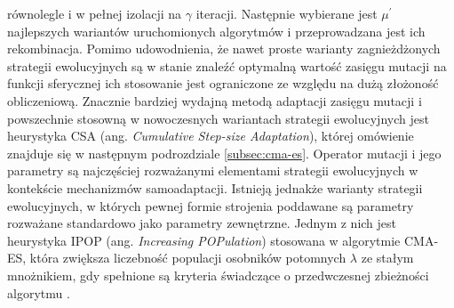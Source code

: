    równolegle i w pełnej izolacji na $\gamma$ iteracji. Następnie wybierane jest $\mu^{'}$ najlepszych wariantów uruchomionych algorytmów i przeprowadzana jest ich rekombinacja. Pomimo udowodnienia, że nawet proste warianty zagnieżdżonych strategii ewolucyjnych są w stanie znaleźć optymalną wartość zasięgu mutacji na funkcji sferycznej \cite{Grunz:1994} ich stosowanie jest ograniczone ze względu na dużą złożoność obliczeniową. Znacznie bardziej wydajną metodą adaptacji zasięgu mutacji i powszechnie stosowną w nowoczesnych wariantach strategii ewolucyjnych jest heurystyka CSA (ang. \textit{Cumulative Step-size Adaptation}), której omówienie znajduje się w następnym podrozdziale \ref{subsec:cma-es}.
    Operator mutacji i jego parametry są najczęściej rozważanymi elementami strategii ewolucyjnych w kontekście mechanizmów samoadaptacji. Istnieją jednakże warianty strategii ewolucyjnych, w których pewnej formie strojenia poddawane są parametry rozważane standardowo jako parametry zewnętrzne. Jednym z nich jest heurystyka IPOP (ang. \textit{Increasing POPulation}) stosowana w algorytmie CMA-ES, która zwiększa liczebność populacji osobników potomnych $\lambda$ ze stałym mnożnikiem, gdy spełnione są kryteria świadczące o przedwczesnej zbieżności algorytmu \cite{Hansen:IPOP}. 

